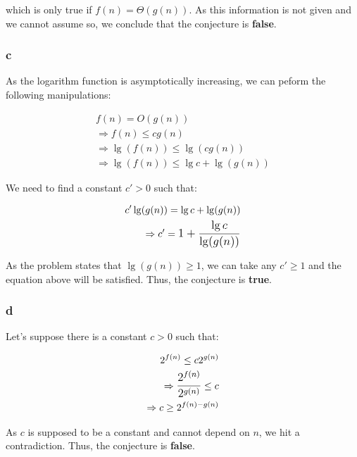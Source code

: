 \documentclass[8pt,a4paper]{article}
\begin{document}
which is only true if $f(n) = \Theta(g(n))$. As this information is not given and we cannot
assume so, we conclude that the conjecture is \textbf{false}.

\subsubsection*{c}

  As the logarithm function is asymptotically increasing, we can peform the following
manipulations:

\begin{equation*}
  \begin{split}
    f(n) = O(g(n)) \\
    \Rightarrow f(n) \leq c g(n) \\
    \Rightarrow \lg(f(n)) \leq \lg(c g(n)) \\
    \Rightarrow \lg(f(n)) \leq \lg c + \lg(g(n))
  \end{split}
\end{equation*}

  We need to find a constant $c' > 0$ such that:

\begin{equation*}
  \begin{split}
    c' \lg(g(n)) = \lg c + \lg(g(n)) \\
    \Rightarrow c' = \mathlarger{1 + \frac{\lg c}{\lg(g(n))}}
  \end{split}
\end{equation*}

  As the problem states that $\lg(g(n)) \geq 1$, we can take any $c' \geq 1$ and the
equation above will be satisfied. Thus, the conjecture is \textbf{true}.

\subsubsection*{d}

  Let's suppose there is a constant $c > 0$ such that:

\begin{equation*}
  \begin{split}
    2^{f(n)} \leq c 2^{g(n)} \\
    \Rightarrow \mathlarger{\frac{2^{f(n)}}{2^{g(n)}}} \leq c \\
    \Rightarrow c \geq 2^{f(n) - g(n)}
  \end{split}
\end{equation*}

  As $c$ is supposed to be a constant and cannot depend on $n$, we hit a
contradiction. Thus, the conjecture is \textbf{false}.
\end{document}
